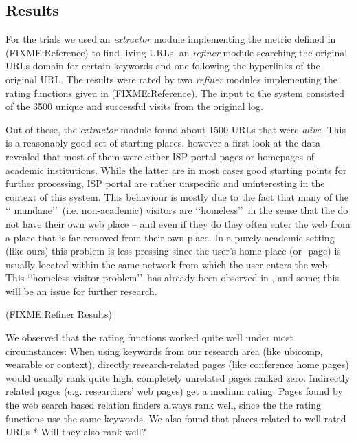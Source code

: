 \documentclass[a4paper]{danarticle}
\theoremstyle{remark}
\begin{document}
    \subsection{Results}
      For the trials we used an \textit{extractor} module implementing the
      metric defined in (FIXME:Reference) to find living URLs, an
      \textit{refiner} module searching the original URLs domain for certain
      keywords and one following the hyperlinks of the original URL. The results
      were rated by two \textit{refiner} modules implementing the rating
      functions given in (FIXME:Reference). The input to the system consisted of
      the 3500 unique and successful visits from the original log.
      
      Out of these, the \textit{extractor} module found about 1500 URLs that
      were \textit{alive}. This is a reasonably good set of starting places,
      however a first look at the data revealed that most of them were either
      ISP portal pages or homepages of academic institutions. While the latter
      are in most cases good starting points for further processing, ISP portal
      are rather unspecific and uninteresting in the context of this system.
      This behaviour is mostly due to the fact that many of the \lq\lq
      mundane\rq\rq\ (i.e. non-academic) visitors are \lq\lq homeless\rq\rq\ in
      the sense that the do not have their own web place -- and even if they do
      they often enter the web from a place that is far removed from their own
      place. In a purely academic setting (like ours) this problem is less
      pressing since the user's home place (or -page) is usually located within
      the same network from which the user enters the web. This \lq\lq homeless
      visitor problem\rq\rq\ has already been observed in \cite{webaware}, and 
      some; this will be an issue for further research.
      
      (FIXME:Refiner Results)
      
      We observed that the rating functions worked quite well under most 
      circumstances: When using keywords from our research area (like ubicomp, 
      wearable or context), directly research-related pages (like conference 
      home pages) would usually rank quite high, completely unrelated pages 
      ranked zero. Indirectly related pages (e.g. researchers' web pages)
      get a medium rating. Pages found by the web search based relation finders 
      always rank well, since the the rating functions use the same keywords. We 
      also found that places related to well-rated URLs 
      * Will they also rank well?
\end{document}
